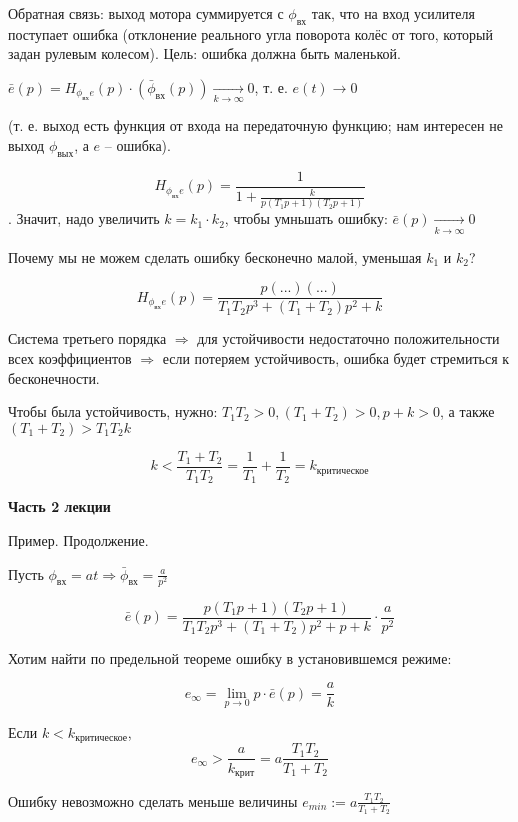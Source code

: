 \documentclass[main.tex]{subfiles}
\begin{document}
Обратная связь: выход мотора суммируется с $ \phi_\text{вх} $ так, что на вход усилителя поступает ошибка (отклонение реального угла поворота колёс от того, который задан рулевым колесом).
Цель: ошибка должна быть маленькой.

$ \bar e(p) = H_{\phi_{\text{вх}} e}(p) \cdot (\bar \phi_{\text{вх}}(p)) \xrightarrow[k \to \infty]{} 0 $, т. е. $ e(t) \to 0 $



(т. е. выход есть функция от входа на передаточную функцию; нам интересен не выход $\phi_{\text{вых}}$, а $e$ -- ошибка).

$$ H_{\phi_{\text{вх}} e}(p) = \frac{1}{1 + \frac{k}{p (T_1 p + 1)(T_2 p + 1)}} $$.
Значит, надо увеличить $k = k_1 \cdot k_2$, чтобы умньшать ошибку: $ \bar e(p) \xrightarrow[k \to \infty]{} 0 $

Почему мы не можем сделать ошибку бесконечно малой, уменьшая $ k_1 $ и $ k_2 $?

$$ H_{\phi_{\text{вх}} e}(p) = \frac{p (...)(...)}{T_1 T_2 p^3 + (T_1 + T_2) p^2 + k} $$

Система третьего порядка $ \Rightarrow $ для устойчивости недостаточно положительности всех коэффициентов $ \Rightarrow $ если потеряем устойчивость, ошибка будет стремиться к бесконечности.

Чтобы была устойчивость, нужно: $ T_1T_2 > 0, (T_1 + T_2) > 0, p + k > 0 $, а также $ (T_1 + T_2) > T_1 T_2 k $

$$ k < \frac{T_1 + T_2}{T_1 T_2} = \frac{1}{T_1} + \frac{1}{T_2} = k_{\text{критическое}} $$



\Large \textbf{Часть 2 лекции} \normalsize

Пример. Продолжение.

Пусть $\phi_{\text{вх}} = at \Rightarrow \bar \phi_{\text{вх}} = \frac{a}{p^2}$

$$ \bar e(p) = \frac{p(T_1 p+1)(T_2 p + 1)}{T_1 T_2 p^3 + (T_1 + T_2)p^2 + p + k} \cdot \frac{a}{p^2} $$

Хотим найти по предельной теореме ошибку в установившемся режиме:

$$ e_\infty = \lim\limits_{p \to 0} p \cdot \bar e(p) = \frac{a}{k} $$

Если $ k < k_{\text{критическое}} $,
$$ e_\infty > \frac{a}{k_{\text{крит}}} = a \frac{T_1 T_2}{ T_1 + T_2} $$

Ошибку невозможно сделать меньше величины $ e_{min} := a \frac{T_1 T_2}{ T_1 + T_2} $
\end{document}
